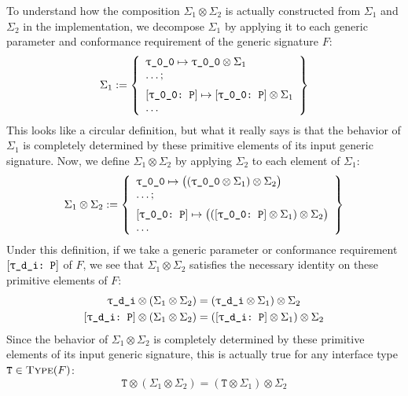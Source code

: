 \documentclass[../generics]{subfiles}
\begin{document}
To understand how the composition $\Sigma_1\otimes\Sigma_2$ is actually constructed from $\Sigma_1$ and $\Sigma_2$ in the implementation, we decompose $\Sigma_1$ by applying it to each generic parameter and conformance requirement of the generic signature $F$:
\[\Sigma_1 := \SubstMapLongC{
\SubstType{\ttgp{0}{0}}{$\ttgp{0}{0}\otimes\Sigma_1$}\\
\ldots
}{
\ConfReq{\ttgp{0}{0}}{P}\mapsto\ConfReq{\ttgp{0}{0}}{P}\otimes\Sigma_1\\
\ldots
}\]
This looks like a circular definition, but what it really says is that the behavior of $\Sigma_1$ is completely determined by these primitive elements of its input generic signature. Now, we define $\Sigma_1\otimes\Sigma_2$ by applying $\Sigma_2$ to each element of $\Sigma_1$:
\[
\Sigma_1\otimes\Sigma_2 := \SubstMapLongC{
\SubstType{\ttgp{0}{0}}{$\bigl((\ttgp{0}{0}\otimes\Sigma_1)\otimes\Sigma_2\bigr)$}\\
\ldots
}{
\ConfReq{\ttgp{0}{0}}{P}\mapsto\bigl((\ConfReq{\ttgp{0}{0}}{P}\otimes\Sigma_1)\otimes\Sigma_2\bigr)\\
\ldots
}
\]
Under this definition, if we take a generic parameter  or conformance requirement $[\texttt{\texttt{$\uptau$\_d\_i}:~P}]$ of $F$, we see that $\Sigma_1\otimes\Sigma_2$ satisfies the necessary identity on these primitive elements of $F$:
\begin{gather*}
\ttgp{d}{i}\otimes(\Sigma_1\otimes\Sigma_2)=(\ttgp{d}{i}\otimes\Sigma_1)\otimes\Sigma_2\\
\ConfReq{\ttgp{d}{i}}{P}\otimes(\Sigma_1\otimes\Sigma_2)=(\ConfReq{\ttgp{d}{i}}{P}\otimes\Sigma_1)\otimes\Sigma_2
\end{gather*}
Since the behavior of $\Sigma_1\otimes\Sigma_2$ is completely determined by these primitive elements of its input generic signature, this is actually true for any interface type $\texttt{T}\in\textsc{Type}({F})$:
\[\texttt{T}\otimes(\Sigma_1\otimes\Sigma_2)=(\texttt{T}\otimes\Sigma_1)\otimes\Sigma_2\]

\newcommand{\FirstMapInExample}{\SubstMap{
\SubstType{T}{Array<A>},\,\SubstType{U}{A}
}}
\newcommand{\SecondMapInExample}{\SubstMap{
\SubstType{A}{Int}
}}
\newcommand{\ThirdMapInExample}{\SubstMap{
\SubstType{T}{Array<Int>},\,\SubstType{U}{Int}
}}
\end{document}
